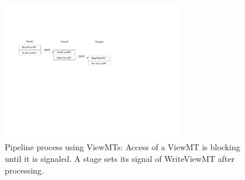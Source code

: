 \begin{figure}[tp]
\includegraphics[width=3.1in]{../viewmt}
\caption{Pipeline process using ViewMTs: Access of a ViewMT is
  blocking until it is signaled. A stage sets its signal of WriteViewMT
after processing.}\label{fig:viewmt}
\end{figure}

